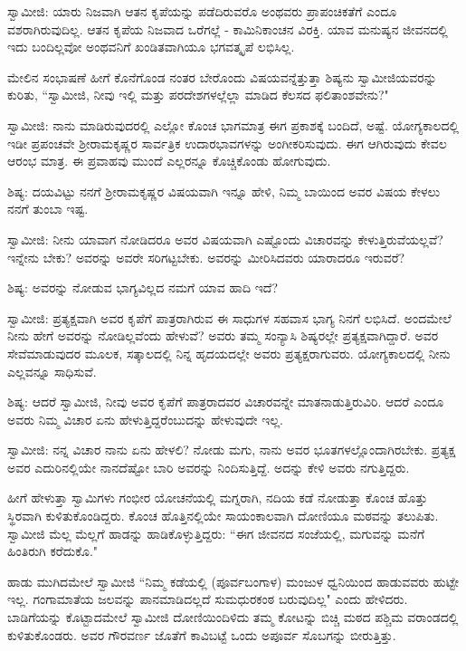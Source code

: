 ಸ್ವಾಮೀಜಿ: ಯಾರು ನಿಜವಾಗಿ ಆತನ ಕೃಪೆಯನ್ನು ಪಡೆದಿರುವರೊ ಅಂಥವರು ಪ್ರಾಪಂಚಿಕತೆಗೆ ಎಂದೂ ವಶರಾಗಿರುವುದಿಲ್ಲ. ಆತನ ಕೃಪೆಯ ನಿಜವಾದ ಒರೆಗಲ್ಲೆ - ಕಾಮಿನಿಕಾಂಚನ ವಿರಕ್ತಿ. ಯಾವ ಮನುಷ್ಯನ ಜೀವನದಲ್ಲಿ ಇದು ಬಂದಿಲ್ಲವೋ ಅಂಥವನಿಗೆ ಖಂಡಿತವಾಗಿಯೂ ಭಗವತ್ಕೃಪೆ ಲಭಿಸಿಲ್ಲ.

ಮೇಲಿನ ಸಂಭಾಷಣೆ ಹೀಗೆ ಕೊನೆಗೊಂಡ ನಂತರ ಬೇರೊಂದು ವಿಷಯವನ್ನೆತ್ತುತ್ತಾ ಶಿಷ್ಯನು ಸ್ವಾಮೀಜಿಯವರನ್ನು ಕುರಿತು, “ಸ್ವಾಮೀಜಿ, ನೀವು ಇಲ್ಲಿ ಮತ್ತು ಪರದೇಶಗಳಲ್ಲೆಲ್ಲಾ ಮಾಡಿದ ಕೆಲಸದ ಫಲಿತಾಂಶವೇನು?"

ಸ್ವಾಮೀಜಿ: ನಾನು ಮಾಡಿರುವುದರಲ್ಲಿ ಎಲ್ಲೋ ಕೊಂಚ ಭಾಗಮಾತ್ರ ಈಗ ಪ್ರಕಾಶಕ್ಕೆ ಬಂದಿದೆ, ಅಷ್ಟೆ. ಯೋಗ್ಯಕಾಲದಲ್ಲಿ ಇಡೀ ಪ್ರಪಂಚವೇ ಶ‍್ರೀರಾಮಕೃಷ್ಣರ ಸಾರ್ವತ್ರಿಕ ಉದಾರಭಾವಗಳನ್ನು ಅಂಗೀಕರಿಸುವುದು. ಈಗ ಆಗಿರುವುದು ಕೇವಲ ಆರಂಭ ಮಾತ್ರ. ಈ ಪ್ರವಾಹವು ಮುಂದೆ ಎಲ್ಲರನ್ನೂ ಕೊಚ್ಚಿಕೊಂಡು ಹೋಗುವುದು.

ಶಿಷ್ಯ: ದಯವಿಟ್ಟು ನನಗೆ ಶ‍್ರೀರಾಮಕೃಷ್ಣರ ವಿಷಯವಾಗಿ ಇನ್ನೂ ಹೇಳಿ, ನಿಮ್ಮ ಬಾಯಿಂದ ಅವರ ವಿಷಯ ಕೇಳಲು ನನಗೆ ತುಂಬಾ ಇಷ್ಟ.

ಸ್ವಾಮೀಜಿ: ನೀನು ಯಾವಾಗ ನೋಡಿದರೂ ಅವರ ವಿಷಯವಾಗಿ ಎಷ್ಟೊಂದು ವಿಚಾರವನ್ನು ಕೇಳುತ್ತಿರುವೆಯಲ್ಲವೆ? ಇನ್ನೇನು ಬೇಕು? ಅವರನ್ನು ಅವರೇ ಸರಿಗಟ್ಟಬೇಕು. ಅವರನ್ನು ಮೀರಿಸಿದವರು ಯಾರಾದರೂ ಇರುವರೆ?

ಶಿಷ್ಯ: ಅವರನ್ನು ನೋಡುವ ಭಾಗ್ಯವಿಲ್ಲದ ನಮಗೆ ಯಾವ ಹಾದಿ ಇದೆ?

ಸ್ವಾಮೀಜಿ: ಪ್ರತ್ಯಕ್ಷವಾಗಿ ಅವರ ಕೃಪೆಗೆ ಪಾತ್ರರಾಗಿರುವ ಈ ಸಾಧುಗಳ ಸಹವಾಸ ಭಾಗ್ಯ ನಿನಗೆ ಲಭಿಸಿದೆ. ಅಂದಮೇಲೆ ನೀನು ಹೇಗೆ ಅವರನ್ನು ನೋಡಿಲ್ಲವೆಂದು ಹೇಳುವೆ? ಅವರು ತಮ್ಮ ಸಂನ್ಯಾಸಿ ಶಿಷ್ಯರಲ್ಲೇ ಪ್ರತ್ಯಕ್ಷವಾಗಿದ್ದಾರೆ. ಅವರ ಸೇವೆಮಾಡುವುದರ ಮೂಲಕ, ಸತ್ಕಾಲದಲ್ಲಿ ನಿನ್ನ ಹೃದಯದಲ್ಲೇ ಅವರು ಪ್ರತ್ಯಕ್ಷರಾಗುವರು. ಯೋಗ್ಯಕಾಲದಲ್ಲಿ ನೀನು ಎಲ್ಲವನ್ನೂ ಸಾಧಿಸುವೆ.

ಶಿಷ್ಯ: ಆದರೆ ಸ್ವಾಮೀಜಿ, ನೀವು ಅವರ ಕೃಪೆಗೆ ಪಾತ್ರರಾದವರ ವಿಚಾರವನ್ನೇ ಮಾತನಾಡುತ್ತಿರುವಿರಿ. ಆದರೆ ಎಂದೂ ಅವರು ನಿಮ್ಮ ವಿಚಾರ ಏನು ಹೇಳುತ್ತಿದ್ದರೆಂಬುದನ್ನು ಹೇಳುವುದೇ ಇಲ್ಲ.

ಸ್ವಾಮೀಜಿ: ನನ್ನ ವಿಚಾರ ನಾನು ಏನು ಹೇಳಲಿ? ನೋಡು ಮಗು, ನಾನು ಅವರ ಭೂತಗಳಲ್ಲೊಂದಾಗಿರಬೇಕು. ಪ್ರತ್ಯಕ್ಷ ಅವರ ಎದುರಿನಲ್ಲಿಯೇ ನಾನದೆಷ್ಟೋ ಬಾರಿ ಅವರನ್ನು ನಿಂದಿಸುತ್ತಿದ್ದೆ. ಅದನ್ನು ಕೇಳಿ ಅವರು ನಗುತ್ತಿದ್ದರು.

ಹೀಗೆ ಹೇಳುತ್ತಾ ಸ್ವಾಮಿಗಳು ಗಂಭೀರ ಯೋಚನೆಯಲ್ಲಿ ಮಗ್ನರಾಗಿ, ನದಿಯ ಕಡೆ ನೋಡುತ್ತಾ ಕೊಂಚ ಹೊತ್ತು ಸ್ಥಿರವಾಗಿ ಕುಳಿತುಕೊಂಡಿದ್ದರು. ಕೊಂಚ ಹೊತ್ತಿನಲ್ಲಿಯೇ ಸಾಯಂಕಾಲವಾಗಿ ದೋಣಿಯೂ ಮಠವನ್ನು ತಲುಪಿತು. ಸ್ವಾಮೀಜಿ ಮೆಲ್ಲ ಮೆಲ್ಲಗೆ ಹಾಡನ್ನು ಹಾಡಿಕೊಳ್ಳುತ್ತಿದ್ದರು: “ಈಗ ಜೀವನದ ಸಂಜೆಯಲ್ಲಿ, ಮಗುವನ್ನು ಮನೆಗೆ ಹಿಂತಿರುಗಿ ಕರೆದುಕೊ."

ಹಾಡು ಮುಗಿದಮೇಲೆ ಸ್ವಾಮೀಜಿ “ನಿಮ್ಮ ಕಡೆಯಲ್ಲಿ (ಪೂರ್ವಬಂಗಾಳ) ಮಂಜುಳ ಧ್ವನಿಯಿಂದ ಹಾಡುವವರು ಹುಟ್ಟೇ ಇಲ್ಲ. ಗಂಗಾಮಾತೆಯ ಜಲವನ್ನು ಪಾನಮಾಡಿದಲ್ಲದೆ ಸುಮಧುರಕಂಠ ಬರುವುದಿಲ್ಲ" ಎಂದು ಹೇಳಿದರು. ಬಾಡಿಗೆಯನ್ನು ಕೊಟ್ಟಾದಮೇಲೆ ಸ್ವಾಮೀಜಿ ದೋಣಿಯಿಂದಿಳಿದು ತಮ್ಮ ಕೋಟನ್ನು ಬಿಚ್ಚಿ ಮಠದ ಪಶ್ಚಿಮ ವರಾಂಡದಲ್ಲಿ ಕುಳಿತುಕೊಂಡರು. ಅವರ ಗೌರವರ್ಣ ಜೊತೆಗೆ ಕಾವಿಬಟ್ಟೆ ಒಂದು ಅಪೂರ್ವ ಸೊಬಗನ್ನು ಬೀರುತ್ತಿತ್ತು.

\newpage

